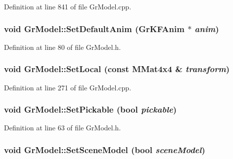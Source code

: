 Definition at line 841 of file GrModel.cpp.\hypertarget{class_gr_model_8ae2497533c112953c1b4d4cc0e72cad}{
\subsubsection[{SetDefaultAnim}]{\setlength{\rightskip}{0pt plus 5cm}void GrModel::SetDefaultAnim ({\bf GrKFAnim} $\ast$ {\em anim})}}
\label{class_gr_model_8ae2497533c112953c1b4d4cc0e72cad}




Definition at line 80 of file GrModel.h.\hypertarget{class_gr_model_e99405dcb83200626b7c715755f70836}{
\subsubsection[{SetLocal}]{\setlength{\rightskip}{0pt plus 5cm}void GrModel::SetLocal (const {\bf MMat4x4} \& {\em transform})}}
\label{class_gr_model_e99405dcb83200626b7c715755f70836}




Definition at line 271 of file GrModel.cpp.\hypertarget{class_gr_model_155e00b717c10f201168f4dfc1f2c141}{
\subsubsection[{SetPickable}]{\setlength{\rightskip}{0pt plus 5cm}void GrModel::SetPickable (bool {\em pickable})}}
\label{class_gr_model_155e00b717c10f201168f4dfc1f2c141}




Definition at line 63 of file GrModel.h.\hypertarget{class_gr_model_905a993701b32fe30d1370deb32e35d2}{
\subsubsection[{SetSceneModel}]{\setlength{\rightskip}{0pt plus 5cm}void GrModel::SetSceneModel (bool {\em sceneModel})}}
\label{class_gr_model_905a993701b32fe30d1370deb32e35d2}


